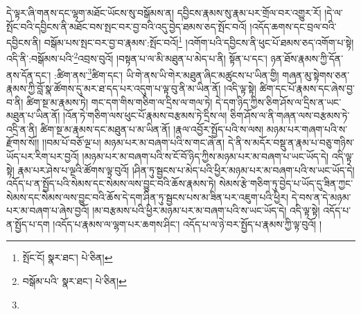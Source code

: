 དེ་ལྟར་ཞི་གནས་དང་ལྷག་མཐོང་ཡོངས་སུ་བསྒོམས་ན། དབྱིངས་རྣམས་སུ་རྣམ་པར་གྲོལ་བར་འགྱུར་རོ། །དེ་ལ་སྤོང་བའི་དབྱིངས་ནི་མཐོང་བས་སྤང་བར་བྱ་བའི་འདུ་བྱེད་ཐམས་ཅད་སྤོང་བའོ། །འདོད་ཆགས་དང་བྲལ་བའི་དབྱིངས་ནི། བསྒོམ་པས་སྤང་བར་བྱ་བ་རྣམས་:སྤོང་བའོ།\footnote{སྤོང་ངོ།  སྣར་ཐང་།  པེ་ཅིན། } །འགོག་པའི་དབྱིངས་ནི་ཕུང་པོ་ཐམས་ཅད་འགོག་པ་སྟེ། འདི་ནི་:བསྒོམས་པའི་\footnote{བསྒོམ་པའི་  སྣར་ཐང་།  པེ་ཅིན། }འབྲས་བུའོ། །བསྟན་པ་ལ་མི་མཐུན་པ་མེད་པ་ནི། སྟོན་པ་དང་། ཉན་ཐོས་རྣམས་ཀྱི་དོན་ནས་དོན་དང་། :ཚིག་ནས་\footnote{}ཚིག་དང་། ཡི་གེ་ནས་ཡི་གེར་མཐུན་ཞིང་མཚུངས་པ་ཡིན་གྱི། གཞན་མུ་སྟེགས་ཅན་རྣམས་ཀྱི་བློ་སྣ་ཚོགས་དུ་མར་ཐ་དད་པར་འདུག་པ་ལྟ་བུ་ནི་མ་ཡིན་ནོ། །འདི་ལྟ་སྟེ། ཚིག་དང་པོ་རྣམས་དང་ཞེས་བྱ་བ་ནི། ཚིག་སྔ་མ་རྣམས་ཏེ། གང་དག་གིས་གཅིག་ལ་དྲིས་ལ་གལ་ཏེ། དེ་དག་ཉིད་ཀྱིས་ཅིག་ཤོས་ལ་དྲིས་ན་ཡང་མཐུན་པ་ཡིན་ནོ། །འོན་ཏེ་གཅིག་ལས་ཕུང་པོ་རྣམས་བརྩམས་ཏེ་དྲིས་ལ། ཅིག་ཤོས་ལ་ནི་གཞན་ལས་བརྩམས་ཏེ་འདྲི་ན་ནི། ཚིག་སྔ་མ་རྣམས་དང་མཐུན་པ་མ་ཡིན་ནོ། །རྣལ་འབྱོར་སྤྱོད་པའི་ས་ལས། མཉམ་པར་གཞག་པའི་ས་རྫོགས་སོ།། །།བམ་པོ་བཅོ་ལྔ་པ། མཉམ་པར་མ་བཞག་པའི་ས་གང་ཞེ་ན། དེ་ནི་ས་མདོར་བསྡུ་ན་རྣམ་པ་བཅུ་གཉིས་ཡོད་པར་རིག་པར་བྱའོ། །མཉམ་པར་མ་བཞག་པའི་ས་ངོ་བོ་ཉིད་ཀྱིས་མཉམ་པར་མ་བཞག་པ་ཡང་ཡོད་དེ། འདི་ལྟ་སྟེ། རྣམ་པར་ཤེས་པ་ལྔའི་ཚོགས་ལྟ་བུའོ། །ཤིན་ཏུ་སྦྱངས་པ་མེད་པའི་ཕྱིར་མཉམ་པར་མ་བཞག་པའི་ས་ཡང་ཡོད་དེ། འདོད་པ་ན་སྤྱོད་པའི་སེམས་དང་སེམས་ལས་བྱུང་བའི་ཆོས་རྣམས་ཏེ། སེམས་རྩེ་གཅིག་ཏུ་བྱེད་པ་ཡོད་དུ་ཟིན་ཀྱང་སེམས་དང་སེམས་ལས་བྱུང་བའི་ཆོས་དེ་དག་ཤིན་ཏུ་སྦྱངས་པས་མ་ཟིན་པར་འཇུག་པའི་ཕྱིར། དེ་བས་ན་དེ་མཉམ་པར་མ་བཞག་པ་ཞེས་བྱའོ། །མ་བརྩམས་པའི་ཕྱིར་མཉམ་པར་མ་བཞག་པའི་ས་ཡང་ཡོད་དེ། འདི་ལྟ་སྟེ། འདོད་པ་ན་སྤྱོད་པ་དག །འདོད་པ་རྣམས་ལ་ལྷག་པར་ཆགས་ཤིང་། འདོད་པ་ལ་ཉེ་བར་སྤྱོད་པ་རྣམས་ཀྱི་ལྟ་བུའོ། །
